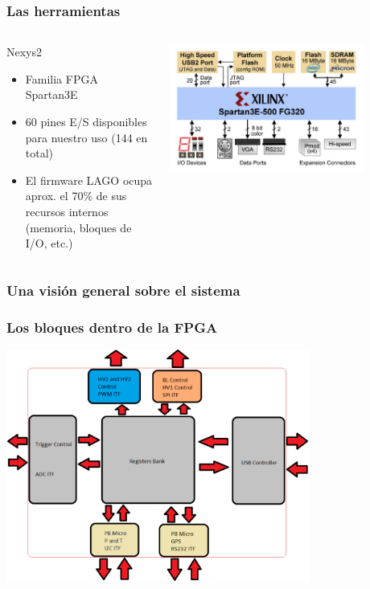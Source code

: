 \documentclass{beamer}
\begin{document}
\begin{frame}
\frametitle{Las herramientas}
  \begin{columns}
    \begin{column}{0.45\textwidth}
      \begin{block}{Nexys2}
        \begin{itemize}
          \item  Familia FPGA Spartan3E
          \item  60 pines E/S disponibles para nuestro uso (144 en total)
          \item  El firmware LAGO ocupa aprox. el 70\% de sus recursos internos
                 (memoria, bloques de I/O, etc.)
        \end{itemize}
      \end{block}
    \end{column} 
    \begin{column}{0.65\textwidth}
      \includegraphics[width=0.8\textwidth]{d5/bloques_nexys2}
    \end{column}
  \end{columns}
\end{frame}

\subsubsection{Una visión general sobre el sistema}

\begin{frame}
  \frametitle{Los bloques dentro de la FPGA}
  \begin{block}{}
    \centering
    \includegraphics[height=0.75\textheight,width=0.75\textwidth]{d5/bloques_fpga_lago}
  \end{block}
\end{frame}
\end{document}
